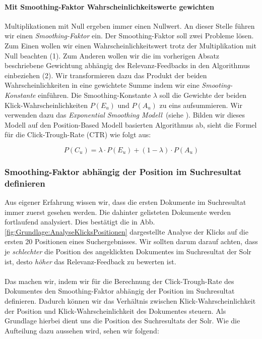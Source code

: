 \paragraph{Mit Smoothing-Faktor Wahrscheinlichkeitswerte gewichten}
Multiplikationen mit Null ergeben immer einen Nullwert. An dieser Stelle führen wir einen \textit{Smoothing-Faktor} ein. Der Smoothing-Faktor soll zwei Probleme lösen. Zum Einen wollen wir einen Wahrscheinlichkeitswert trotz der Multiplikation mit Null beachten (1). Zum Anderen wollen wir die im vorherigen Absatz beschriebene Gewichtung abhängig des Relevanz-Feedbacks in den Algorithmus einbeziehen (2). Wir transformieren dazu das Produkt der beiden Wahrscheinlichkeiten in eine gewichtete Summe indem wir eine \textit{Smooting-Konstante} einführen. Die Smoothing-Konstante $\lambda$ soll die Gewichte der beiden Klick-Wahrscheinlichkeiten $P(E_{u})$ und $P(A_{u})$ zu eins aufsummieren. Wir verwenden dazu das \textit{Exponential Smoothing Modell}~(siehe \cite{ExpSmoothing}). Bilden wir dieses Modell auf den Position-Based Modell basierten Algorithmus ab, sieht die Formel für die Click-Trough-Rate (CTR) wie folgt aus:
  
\begin{equation}
	P(C_{u}) = \lambda\cdot P(E_{u}) + (1 - \lambda)\cdot P(A_{u})
\end{equation}


\subsubsection{Smoothing-Faktor abhängig der Position im Suchresultat definieren}
\label{sec:Reranking:Methodik:Result-RerankingPBM:VerhaeltnisKlick-Wahrscheinlichkeiten}

Aus eigener Erfahrung wissen wir, dass die ersten Dokumente im Suchresultat immer zuerst gesehen werden. Die dahinter gelisteten Dokumente werden fortlaufend analysiert. Dies bestätigt die in Abb. \ref{fig:Grundlage:AnalyseKlicksPositionen} dargestellte Analyse der Klicks auf die ersten 20 Positionen eines Suchergebnisses. Wir sollten darum darauf achten, dass je \textit{schlechter} die Position des angeklickten Dokumentes im Suchresultat der Solr ist, desto \textit{höher} das Relevanz-Feedback zu bewerten ist. 
\\
\\
Das machen wir, indem wir für die Berechnung der Click-Trough-Rate des Dokumentes den Smoothing-Faktor abhängig der Position im Suchresultat definieren. Dadurch können wir das Verhältnis zwischen Klick-Wahrscheinlichkeit der Position und Klick-Wahrscheinlichkeit des Dokumentes steuern. Als Grundlage hierbei dient uns die Position des Suchresultats der Solr. Wie die Aufteilung dazu aussehen wird, sehen wir folgend:

